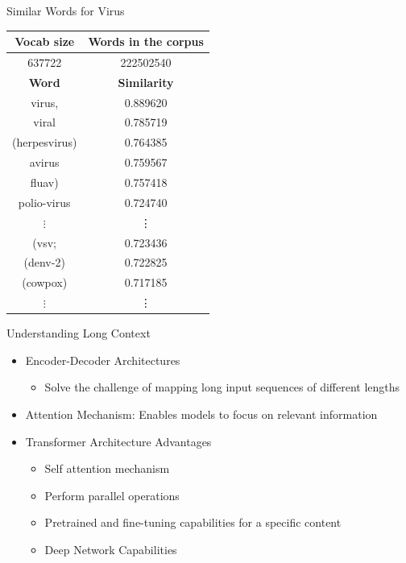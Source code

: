 \begin{frame}{Similar Words for Virus}
    \centering
    \begin{tabular}{|c|c|}
        \hline
        \textbf{Vocab size}& \textbf{Words in the corpus}\\
        \hline
        637722
        & 222502540\\
        \hline
        \hline
        	\hline
        	\textbf{Word}&\textbf{Similarity}\\
        	\hline
        virus,&0.889620\\
        viral&0.785719\\
        (herpesvirus)&0.764385\\
        avirus&0.759567\\
        fluav)&0.757418\\
        polio-virus&0.724740\\
        $\vdots$&\vdots\\
        (vsv;&0.723436\\
        (denv-2)&0.722825\\
        (cowpox)&0.717185  \\
        $\vdots$&\vdots\\
        	\hline
    \end{tabular}
\end{frame}


\begin{frame}{Understanding Long Context}
    \begin{itemize}
        \item Encoder-Decoder Architectures
        \begin{itemize}
            \item Solve the challenge of mapping long input sequences of different lengths
        \end{itemize}
        \item Attention Mechanism: Enables models to focus on relevant information
        \item Transformer Architecture Advantages
        \begin{itemize}
            \item Self attention mechanism
            \item Perform parallel operations
            \item Pretrained and fine-tuning capabilities for a specific content
            \item Deep Network Capabilities
        \end{itemize}
    \end{itemize}
\end{frame}

